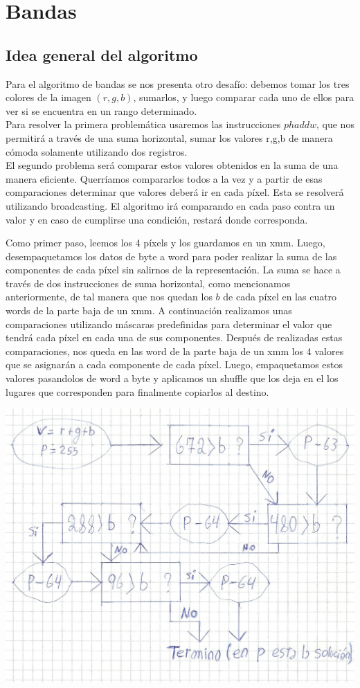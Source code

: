 \documentclass[a4paper]{article}
\begin{document}
\newpage
\section{Bandas}
\subsection{Idea general del algoritmo}
Para el algoritmo de bandas se nos presenta otro desafío: debemos tomar los tres colores de la imagen $(r,g,b)$, sumarlos, y luego comparar cada uno de ellos para ver si se encuentra en un rango determinado.
\\
Para resolver la primera problemática usaremos las instrucciones $phaddw$, que nos permitirá a través de una suma horizontal, sumar los valores r,g,b de manera cómoda solamente utilizando dos registros.
\\
El segundo problema será comparar estos valores obtenidos en la suma de una manera eficiente. Querríamos compararlos todos a la vez y a partir de esas comparaciones determinar que valores deberá ir en cada píxel. Esta se resolverá utilizando broadcasting. El algoritmo irá comparando en cada paso contra un valor y en caso de cumplirse una condición, restará donde corresponda.

Como primer paso, leemos los 4 píxels y los guardamos en un xmm. Luego, desempaquetamos los datos de byte a word para poder realizar la suma de las componentes de cada píxel sin salirnos de la representación. La suma se hace a través de dos instrucciones de suma horizontal, como mencionamos anteriormente, de tal manera que nos quedan los $b$ de cada píxel en las cuatro words de la parte baja de un xmm. A continuación realizamos unas comparaciones utilizando máscaras predefinidas para determinar el valor que tendrá cada píxel en cada una de sus componentes. Después de realizadas estas comparaciones, nos queda en las word de la parte baja de un xmm los 4 valores que se asignarán a cada componente de cada píxel. Luego, empaquetamos estos valores pasandolos de word a byte y aplicamos un shuffle que los deja en el los lugares que corresponden para finalmente copiarlos al destino. 

\begin{center}
\includegraphics[scale=0.66]{Dibujos/B1.jpg}
\end{center}
\end{document}
